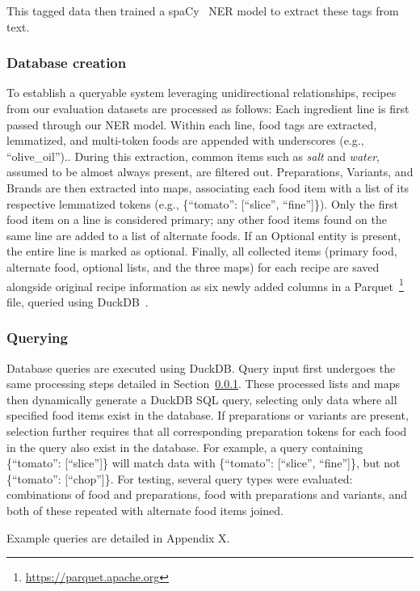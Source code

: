 \documentclass[11pt]{article}
\begin{document}
This tagged data then trained a spaCy~\cite{spacy} NER model to extract these tags from text.

\subsubsection{Database creation}\label{sec:dbStructure}
To establish a queryable system leveraging unidirectional relationships, recipes
from our evaluation datasets are processed as follows: Each ingredient line is
first passed through our NER model.
Within each line, food tags are extracted, lemmatized, and multi-token foods are
appended with underscores (e.g., ``olive\_oil'')..
During this extraction, common items such as \emph{salt} and \emph{water},
assumed to be almost always present, are filtered out.
Preparations, Variants, and Brands are then extracted into maps, associating
each food item with a list of its respective lemmatized tokens (e.g.,
\{``tomato'': [``slice'', ``fine'']\}).
Only the first food item on a line is considered primary; any other food items
found on the same line are added to a list of alternate foods.
If an Optional entity is present, the entire line is marked as optional.
Finally, all collected items (primary food, alternate food, optional lists, and
the three maps) for each recipe are saved alongside original recipe information
as six newly added columns in a
Parquet~\footnote{\url{https://parquet.apache.org}} file, queried using
DuckDB~\cite{duckdb}.

\subsubsection{Querying}
Database queries are executed using DuckDB\@.
Query input first undergoes the same processing steps detailed in
Section~\ref{sec:dbStructure}.
These processed lists and maps then dynamically generate a DuckDB SQL query,
selecting only data where all specified food items exist in the database.
If preparations or variants are present, selection further requires that all
corresponding preparation tokens for each food in the query also exist in the
database.
For example, a query containing \{``tomato'': [``slice'']\} will match data with
\{``tomato'': [``slice'', ``fine'']\}, but not \{``tomato'': [``chop'']\}.
For testing, several query types were evaluated: combinations of food and
preparations, food with preparations and variants, and both of these repeated
with alternate food items joined.

Example queries are detailed in Appendix X.
\end{document}
